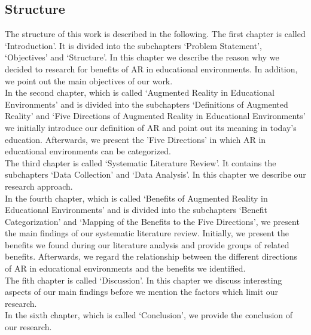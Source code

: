 \subsection{Structure}
The structure of this work is described in the following. The first chapter is called ‘Introduction’. It is divided into the subchapters ‘Problem Statement’, ‘Objectives’ and ‘Structure’. In this chapter we describe the reason why we decided to research for benefits of AR in educational environments. In addition, we point out the main objectives of our work.\\
In the second chapter, which is called ‘Augmented Reality in Educational Environments’ and is divided into the subchapters ‘Definitions of Augmented Reality’ and ‘Five Directions of Augmented Reality in Educational Environments’ we initially introduce our definition of AR and point out its meaning in today's education. Afterwards, we present the 'Five Directions' \autocite [cf.]{Yuen.2011} in which AR in educational environments can be categorized.\\
The third chapter is called ‘Systematic Literature Review’. It contains the subchapters ‘Data Collection’ and ‘Data Analysis’. In this chapter we describe our research approach.\\
In the fourth chapter, which is called ‘Benefits of Augmented Reality in Educational Environments’ and is divided into the subchapters ‘Benefit Categorization’ and ‘Mapping of the Benefits to the Five Directions’, we present the main findings of our systematic literature review. Initially, we present the benefits we found during our literature analysis and provide groups of related benefits. Afterwards, we regard the relationship between the different directions of AR in educational environments and the benefits we identified.\\
The fith chapter is called ‘Discussion’. In this chapter we discuss interesting aspects of our main findings before we mention the factors which limit our research.\\
In the sixth chapter, which is called ‘Conclusion’, we provide the conclusion of our research.